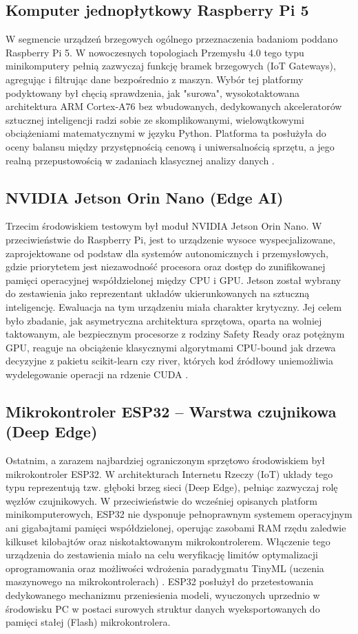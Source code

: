 \documentclass[12pt,twoside]{article}
\begin{document}
\subsection{Komputer jednopłytkowy Raspberry Pi 5}
W segmencie urządzeń brzegowych ogólnego przeznaczenia badaniom poddano Raspberry Pi 5. W nowoczesnych topologiach Przemysłu 4.0 tego typu minikomputery pełnią zazwyczaj funkcję bramek brzegowych (IoT Gateways), agregując i filtrując dane bezpośrednio z maszyn. Wybór tej platformy podyktowany był chęcią sprawdzenia, jak "surowa", wysokotaktowana architektura ARM Cortex-A76 bez wbudowanych, dedykowanych akceleratorów sztucznej inteligencji radzi sobie ze skomplikowanymi, wielowątkowymi obciążeniami matematycznymi w języku Python. Platforma ta posłużyła do oceny balansu między przystępnością cenową i uniwersalnością sprzętu, a jego realną przepustowością w zadaniach klasycznej analizy danych \cite{rpi5specs}.

\subsection{NVIDIA Jetson Orin Nano (Edge AI)}
Trzecim środowiskiem testowym był moduł NVIDIA Jetson Orin Nano. W przeciwieństwie do Raspberry Pi, jest to urządzenie wysoce wyspecjalizowane, zaprojektowane od podstaw dla systemów autonomicznych i przemysłowych, gdzie priorytetem jest niezawodność procesora oraz dostęp do zunifikowanej pamięci operacyjnej współdzielonej między CPU i GPU. Jetson został wybrany do zestawienia jako reprezentant układów ukierunkowanych na sztuczną inteligencję. Ewaluacja na tym urządzeniu miała charakter krytyczny. Jej celem było zbadanie, jak asymetryczna architektura sprzętowa, oparta na wolniej taktowanym, ale bezpiecznym procesorze z rodziny Safety Ready oraz potężnym GPU, reaguje na obciążenie klasycznymi algorytmami CPU-bound jak drzewa decyzyjne z pakietu scikit-learn czy river, których kod źródłowy uniemożliwia wydelegowanie operacji na rdzenie CUDA \cite{jetsonspecs}.

\subsection{Mikrokontroler ESP32 – Warstwa czujnikowa (Deep Edge)}

Ostatnim, a zarazem najbardziej ograniczonym sprzętowo środowiskiem był mikrokontroler ESP32. W architekturach Internetu Rzeczy (IoT) układy tego typu reprezentują tzw. głęboki brzeg sieci (Deep Edge), pełniąc zazwyczaj rolę węzłów czujnikowych. W przeciwieństwie do wcześniej opisanych platform minikomputerowych, ESP32 nie dysponuje pełnoprawnym systemem operacyjnym ani gigabajtami pamięci współdzielonej, operując zasobami RAM rzędu zaledwie kilkuset kilobajtów oraz niskotaktowanym mikrokontrolerem.
Włączenie tego urządzenia do zestawienia miało na celu weryfikację limitów optymalizacji oprogramowania oraz możliwości wdrożenia paradygmatu TinyML (uczenia maszynowego na mikrokontrolerach) \cite{capogrosso2024tinyml}. ESP32 posłużył do przetestowania dedykowanego mechanizmu przeniesienia modeli, wyuczonych uprzednio w środowisku PC w postaci surowych struktur danych wyeksportowanych do pamięci stałej (Flash) mikrokontrolera.
\end{document}

